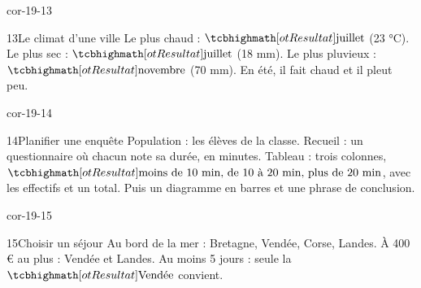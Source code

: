 \begin{blocLivre}{cor-19-13}\begin{corrige}{13}{Le climat d’une ville}
Le plus chaud : $\res{\text{juillet}}$ (23 °C). Le plus sec : $\res{\text{juillet}}$ (18 mm). Le plus pluvieux : $\res{\text{novembre}}$ (70 mm). En été, il fait chaud et il pleut peu.
\label{fig-cor-19-13}
\end{corrige}\end{blocLivre}
\begin{blocLivre}{cor-19-14}\begin{corrige}{14}{Planifier une enquête}
Population : les élèves de la classe. Recueil : un questionnaire où chacun note sa durée, en minutes. Tableau : trois colonnes, $\res{\text{moins de 10 min, de 10 à 20 min, plus de 20 min}}$, avec les effectifs et un total. Puis un diagramme en barres et une phrase de conclusion.
\end{corrige}\end{blocLivre}
\begin{blocLivre}{cor-19-15}\begin{corrige}{15}{Choisir un séjour}
Au bord de la mer : Bretagne, Vendée, Corse, Landes. À 400 € au plus : Vendée et Landes. Au moins 5 jours : seule la $\res{\text{Vendée}}$ convient.
\end{corrige}\end{blocLivre}
